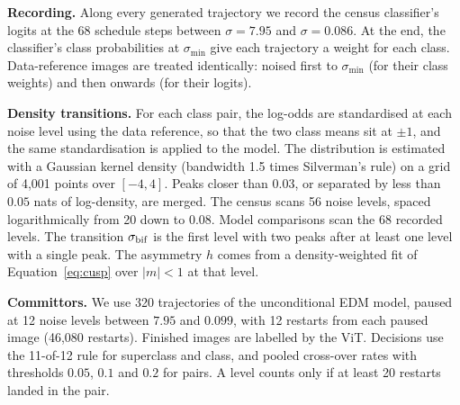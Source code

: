 \documentclass[11pt]{article}
\newcommand{\para}[1]{\textbf{#1}\hspace{0.6em}}
\newcommand{\sbif}{\sigma_{\rm bif}}
\begin{document}
\para{Recording.}
Along every generated trajectory we record the census classifier's logits at the 68 schedule steps between $\sigma=7.95$ and $\sigma=0.086$. At the end, the classifier's class probabilities at $\sigma_{\min}$ give each trajectory a weight for each class. Data-reference images are treated identically: noised first to $\sigma_{\min}$ (for their class weights) and then onwards (for their logits).

\para{Density transitions.}
For each class pair, the log-odds are standardised at each noise level using the data reference, so that the two class means sit at $\pm1$, and the same standardisation is applied to the model. The distribution is estimated with a Gaussian kernel density (bandwidth 1.5 times Silverman's rule) on a grid of 4{,}001 points over $[-4,4]$. Peaks closer than $0.03$, or separated by less than $0.05$ nats of log-density, are merged. The census scans 56 noise levels, spaced logarithmically from 20 down to $0.08$. Model comparisons scan the 68 recorded levels. The transition $\sbif$ is the first level with two peaks after at least one level with a single peak. The asymmetry $h$ comes from a density-weighted fit of Equation~\eqref{eq:cusp} over $|m|<1$ at that level.

\para{Committors.}
We use 320 trajectories of the unconditional EDM model, paused at 12 noise levels between $7.95$ and $0.099$, with 12 restarts from each paused image (46{,}080 restarts). Finished images are labelled by the ViT. Decisions use the 11-of-12 rule for superclass and class, and pooled cross-over rates with thresholds $0.05$, $0.1$ and $0.2$ for pairs. A level counts only if at least 20 restarts landed in the pair.
\end{document}
